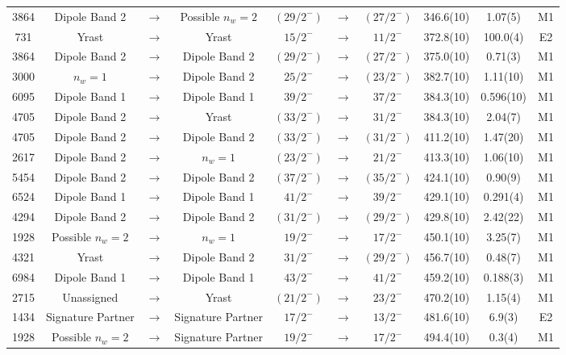\begin{landscape}
\begin{center}
\begin{longtable}{|c|ccc|ccc|c|c|c|}
 3864 &Dipole Band 2&$ \rightarrow $&Possible $n_w=2$&$ (29/2^{-}) $&$ \rightarrow $&$ (27/2^{-}) $& 346.6(10) & 1.07(5) & M1 \\
 731 &Yrast&$ \rightarrow $&Yrast&$ 15/2^{-} $&$ \rightarrow $&$ 11/2^{-} $& 372.8(10) & 100.0(4) & E2 \\
 3864 &Dipole Band 2&$ \rightarrow $&Dipole Band 2&$ (29/2^{-}) $&$ \rightarrow $&$ (27/2^{-}) $& 375.0(10) & 0.71(3) & M1 \\
 3000 &$n_w=1$&$ \rightarrow $&Dipole Band 2&$ 25/2^{-} $&$ \rightarrow $&$ (23/2^{-}) $& 382.7(10) & 1.11(10) & M1 \\
 6095 &Dipole Band 1&$ \rightarrow $&Dipole Band 1&$ 39/2^{-} $&$ \rightarrow $&$ 37/2^{-} $& 384.3(10) & 0.596(10) & M1 \\
 4705 &Dipole Band 2&$ \rightarrow $&Yrast&$ (33/2^{-}) $&$ \rightarrow $&$ 31/2^{-} $& 384.3(10) & 2.04(7) & M1 \\
 4705 &Dipole Band 2&$ \rightarrow $&Dipole Band 2&$ (33/2^{-}) $&$ \rightarrow $&$ (31/2^{-}) $& 411.2(10) & 1.47(20) & M1 \\
 2617 &Dipole Band 2&$ \rightarrow $&$n_w=1$&$ (23/2^{-}) $&$ \rightarrow $&$ 21/2^{-} $& 413.3(10) & 1.06(10) & M1 \\
 5454 &Dipole Band 2&$ \rightarrow $&Dipole Band 2&$ (37/2^{-}) $&$ \rightarrow $&$ (35/2^{-}) $& 424.1(10) & 0.90(9) & M1 \\
 6524 &Dipole Band 1&$ \rightarrow $&Dipole Band 1&$ 41/2^{-} $&$ \rightarrow $&$ 39/2^{-} $& 429.1(10) & 0.291(4) & M1 \\
 4294 &Dipole Band 2&$ \rightarrow $&Dipole Band 2&$ (31/2^{-}) $&$ \rightarrow $&$ (29/2^{-}) $& 429.8(10) & 2.42(22) & M1 \\
 1928 &Possible $n_w=2$&$ \rightarrow $&$n_w=1$&$ 19/2^{-} $&$ \rightarrow $&$ 17/2^{-} $& 450.1(10) & 3.25(7) & M1 \\
 4321 &Yrast&$ \rightarrow $&Dipole Band 2&$ 31/2^{-} $&$ \rightarrow $&$ (29/2^{-}) $& 456.7(10) & 0.48(7) & M1 \\
 6984 &Dipole Band 1&$ \rightarrow $&Dipole Band 1&$ 43/2^{-} $&$ \rightarrow $&$ 41/2^{-} $& 459.2(10) & 0.188(3) & M1 \\
 2715 &Unassigned&$ \rightarrow $&Yrast&$ (21/2^{-}) $&$ \rightarrow $&$ 23/2^{-} $& 470.2(10) & 1.15(4) & M1 \\
 1434 &Signature Partner&$ \rightarrow $&Signature Partner&$ 17/2^{-} $&$ \rightarrow $&$ 13/2^{-} $& 481.6(10) & 6.9(3) & E2 \\
 1928 &Possible $n_w=2$&$ \rightarrow $&Signature Partner&$ 19/2^{-} $&$ \rightarrow $&$ 17/2^{-} $& 494.4(10) & 0.3(4) & M1 \\

\end{longtable}
\end{center}
\end{landscape}
